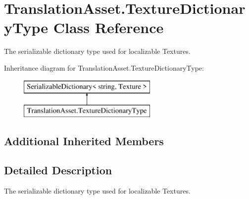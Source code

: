 \hypertarget{class_translation_asset_1_1_texture_dictionary_type}{}\section{Translation\+Asset.\+Texture\+Dictionary\+Type Class Reference}
\label{class_translation_asset_1_1_texture_dictionary_type}


The serializable dictionary type used for localizable Textures.  


Inheritance diagram for Translation\+Asset.\+Texture\+Dictionary\+Type\+:\begin{figure}[H]
\begin{center}
\leavevmode
\includegraphics[height=2.000000cm]{class_translation_asset_1_1_texture_dictionary_type}
\end{center}
\end{figure}
\subsection*{Additional Inherited Members}


\subsection{Detailed Description}
The serializable dictionary type used for localizable Textures. 

